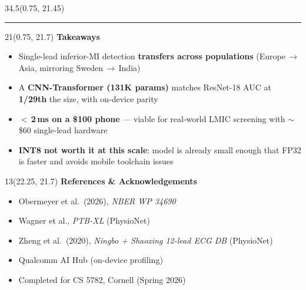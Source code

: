 \documentclass[final]{article}
\newcommand{\subheadfs}{\fontsize{26}{32}\selectfont}
\newcommand{\bodyfs}{\fontsize{21}{26}\selectfont}
\newcommand{\tinyfs}{\fontsize{17}{21}\selectfont}
\begin{document}
\begin{textblock}{34.5}(0.75, 21.45)
\textcolor{cornellred}{\rule{\linewidth}{3pt}}
\end{textblock}

\begin{textblock}{21}(0.75, 21.7)
\bodyfs\RaggedRight
{\subheadfs\bfseries\color{cornellred}Takeaways}\\[0.08in]
\begin{itemize}
  \item Single-lead inferior-MI detection \textbf{transfers across populations} (Europe\,$\rightarrow$\,Asia, mirroring Sweden\,$\rightarrow$\,India)
  \item A \textbf{CNN-Transformer (131K params)} matches ResNet-18 AUC at \textbf{1/29th} the size, with on-device parity
  \item \textbf{$<$\,2\,ms on a \$100 phone} --- viable for real-world LMIC screening with $\sim$\$60 single-lead hardware
  \item \textbf{INT8 not worth it at this scale}: model is already small enough that FP32 is faster and avoids mobile toolchain issues
\end{itemize}
\end{textblock}

\begin{textblock}{13}(22.25, 21.7)
\tinyfs\RaggedRight
{\subheadfs\bfseries\color{cornellred}References \& Acknowledgements}\\[0.08in]
\begin{itemize}
  \item Obermeyer et al.\ (2026), \emph{NBER WP 34690}
  \item Wagner et al., \emph{PTB-XL} (PhysioNet)
  \item Zheng et al.\ (2020), \emph{Ningbo + Shaoxing 12-lead ECG DB} (PhysioNet)
  \item Qualcomm AI Hub (on-device profiling)
  \item Completed for CS 5782, Cornell (Spring 2026)
\end{itemize}
\end{textblock}
\end{document}
